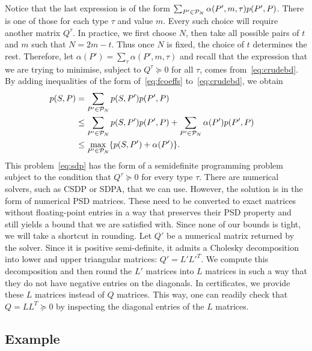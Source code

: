 \documentclass[12pt, a4paper, twoside]{report}
\begin{document}
Notice that the last expression is of the form $\sum_{P' \in \P_N} \alpha(P',m,\tau)p(P',P)$. There is one of those for each type $\tau$ and value $m$. Every such choice will require another matrix $Q^\tau$. In practice, we first choose $N$, then take all possible pairs of $t$ and $m$ such that $N = 2m-t$. Thus once $N$ is fixed, the choice of $t$ determines the rest. Therefore, let $\alpha(P') = \sum_{\tau} \alpha(P',m,\tau)$ and recall that the expression that we are trying to minimise, subject to $Q^\tau \succeq 0$ for all $\tau$, comes from~\eqref{eq:crudebd}. By adding inequalities of the form of~\eqref{eq:fcoeffs} to~\eqref{eq:crudebd}, we obtain 
\begin{align}
p(S,P) &= \sum_{P'\in \P_N}p(S,P')p(P',P) \notag\\
  &\leq \sum_{P'\in \P_N}p(S,P')p(P',P) + \sum_{P'\in \P_N}\alpha(P')p(P',P)\quad \notag\\
  &\leq \max_{P'\in \P_N}\{p(S,P') + \alpha(P')\}. \label{eq:sdp}
\end{align}
This problem~\eqref{eq:sdp} has the form of a semidefinite programming problem subject to the condition that $Q^\tau \succeq 0$ for every type $\tau$. There are numerical solvers, such as CSDP or SDPA, that we can use. However, the solution is in the form of numerical PSD matrices. These need to be converted to exact matrices without floating-point entries in a way that preserves their PSD property and still yields a bound that we are satisfied with. Since none of our bounds is tight, we will take a shortcut in rounding. Let $Q'$ be a numerical matrix returned by the solver. Since it is positive semi-definite, it admits a Cholesky decomposition into lower and upper triangular matrices: $Q' = L'L'^T$. We compute this decomposition and then round the $L'$ matrices into $L$ matrices in such a way that they do not have negative entries on the diagonals. In certificates, we provide these $L$ matrices instead of $Q$ matrices. This way, one can readily check that $Q = LL^T \succeq 0$ by inspecting the diagonal entries of the $L$ matrices. 
\subsection{Example}
\label{sec:example}
\end{document}
